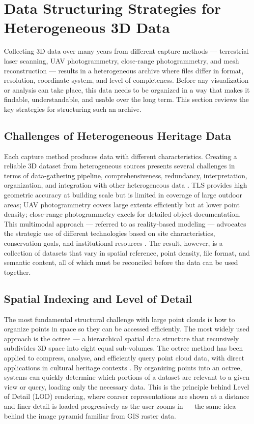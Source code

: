 \documentclass[]{report}
\begin{document}
\section{Data Structuring Strategies for Heterogeneous 3D Data}
\label{sec:structuring}

Collecting 3D data over many years from different capture methods --- terrestrial laser
scanning, UAV photogrammetry, close-range photogrammetry, and mesh reconstruction --- results
in a heterogeneous archive where files differ in format, resolution, coordinate system, and
level of completeness. Before any visualization or analysis can take place, this data needs to
be organized in a way that makes it findable, understandable, and usable over the long term.
This section reviews the key strategies for structuring such an archive.

\subsection{Challenges of Heterogeneous Heritage Data}

Each capture method produces data with different characteristics. Creating a reliable 3D
dataset from heterogeneous sources presents several challenges in terms of data-gathering
pipeline, comprehensiveness, redundancy, interpretation, organization, and integration with
other heterogeneous data \cite{malik2023heterogeneous}. TLS provides high geometric accuracy
at building scale but is limited in coverage of large outdoor areas; UAV photogrammetry covers
large extents efficiently but at lower point density; close-range photogrammetry excels for
detailed object documentation. This multimodal approach --- referred to as reality-based
modeling --- advocates the strategic use of different technologies based on site
characteristics, conservation goals, and institutional resources \cite{liu2025tls}. The result,
however, is a collection of datasets that vary in spatial reference, point density, file
format, and semantic content, all of which must be reconciled before the data can be used
together.

\subsection{Spatial Indexing and Level of Detail}

The most fundamental structural challenge with large point clouds is how to organize points in
space so they can be accessed efficiently. The most widely used approach is the octree --- a
hierarchical spatial data structure that recursively subdivides 3D space into eight equal
sub-volumes. The octree method has been applied to compress, analyse, and efficiently query
point cloud data, with direct applications in cultural heritage contexts
\cite{bienkowski_use_2023}. By organizing points into an octree, systems can quickly determine
which portions of a dataset are relevant to a given view or query, loading only the necessary
data. This is the principle behind Level of Detail (LOD) rendering, where coarser
representations are shown at a distance and finer detail is loaded progressively as the user
zooms in --- the same idea behind the image pyramid familiar from GIS raster data.
\end{document}
